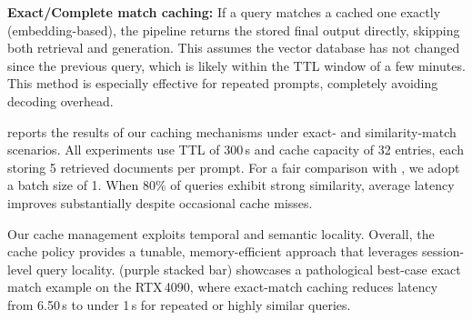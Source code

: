 \noindent\textbf{Exact/Complete match caching:}  
If a query matches a cached one exactly (embedding-based), the pipeline returns the stored final output directly, skipping both retrieval and generation. This assumes the vector database has not changed since the previous query, which is likely within the TTL window of a few minutes. This method is especially effective for repeated prompts, completely avoiding decoding overhead.

  reports the results of our caching mechanisms under exact- and similarity-match scenarios. 
All experiments use TTL of 300\,s and cache capacity of 32 entries, each storing 5 retrieved documents per prompt. 
For a fair comparison with \edgeRAG{}, we adopt a batch size of 1.
When 80\% of queries exhibit strong similarity, average latency improves substantially despite occasional cache misses.

Our cache management exploits temporal and semantic locality. 
Overall, the cache policy provides a tunable, memory-efficient approach that leverages session-level query locality.
 (purple stacked bar) showcases a pathological best-case exact match example on the RTX\,4090, where exact-match caching reduces latency from 6.50\,s to under 1\,s for repeated or highly similar queries.




